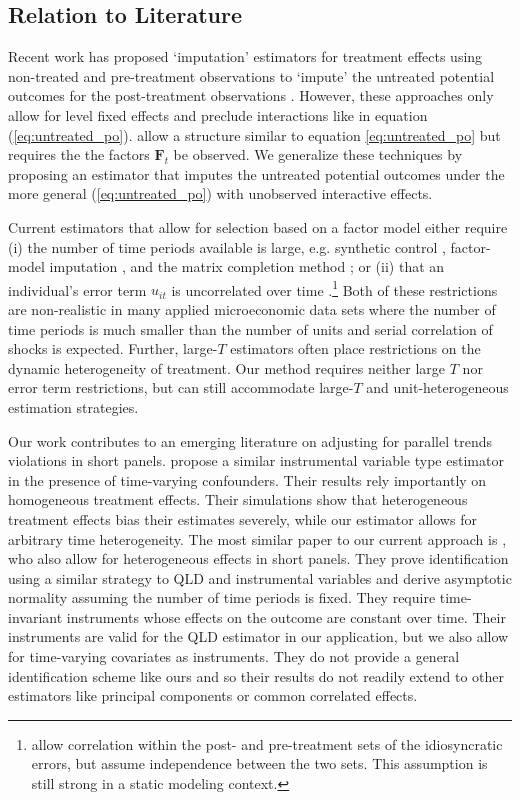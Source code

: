 \subsection*{Relation to Literature}

Recent work has proposed `imputation' estimators for treatment effects using non-treated and pre-treatment observations to `impute' the untreated potential outcomes for the post-treatment observations \citep[e.g.][]{Borusyak_Jaravel_Spiess_2021,Gardner_2021,Wooldridge_2021}. However, these approaches only allow for level fixed effects and preclude interactions like in equation (\ref{eq:untreated_po}). \citet{Borusyak_Jaravel_Spiess_2021} allow a structure similar to equation \eqref{eq:untreated_po} but requires the the factors $\bm{F}_t$ be observed. We generalize these techniques by proposing an estimator that imputes the untreated potential outcomes under the more general (\ref{eq:untreated_po}) with unobserved interactive effects.

Current estimators that allow for selection based on a factor model either require (i) the number of time periods available is large, e.g. synthetic control \citep{abadie2021using}, factor-model imputation \citep{Xu_2017,Gobillon_Magnac_2016}, and the matrix completion method  \citep{Athey_et_al_2021,fernandez2021low}; or (ii) that an individual's error term $u_{it}$ is uncorrelated over time \citep{Imbens_Kallus_Mao_2021}.\footnote{\citet{Imbens_Kallus_Mao_2021} allow correlation within the post- and pre-treatment sets of the idiosyncratic errors, but assume independence between the two sets. This assumption is still strong in a static modeling context.} Both of these restrictions are non-realistic in many applied microeconomic data sets where the number of time periods is much smaller than the number of units and serial correlation of shocks is expected. Further, large-$T$ estimators often place restrictions on the dynamic heterogeneity of treatment. Our method requires neither large $T$ nor error term restrictions, but can still accommodate large-$T$ and unit-heterogeneous estimation strategies.

Our work contributes to an emerging literature on adjusting for parallel trends violations in short panels. \citet{freyaldenhoven2019pre} propose a similar instrumental variable type estimator in the presence of time-varying confounders. Their results rely importantly on homogeneous treatment effects. Their simulations show that heterogeneous treatment effects bias their estimates severely, while our estimator allows for arbitrary time heterogeneity. The most similar paper to our current approach is \citet{Callaway_Karami_2020}, who also allow for heterogeneous effects in short panels. They prove identification using a similar strategy to QLD and instrumental variables and derive asymptotic normality assuming the number of time periods is fixed. They require time-invariant instruments whose effects on the outcome are constant over time. Their instruments are valid for the QLD estimator in our application, but we also allow for time-varying covariates as instruments. They do not provide a general identification scheme like ours and so their results do not readily extend to other estimators like principal components or common correlated effects.

